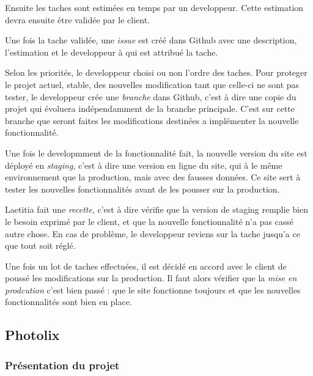 \bigskip

Ensuite les taches sont estimées en temps par un developpeur. Cette
estimation devra ensuite étre validée par le client.

\bigskip

Une fois la tache validée, une \emph{issue} est créé dans Github avec
une description, l'estimation et le developpeur à qui est attribué la
tache.

\bigskip

Selon les priorités, le developpeur choisi ou non l'ordre des taches.
Pour proteger le projet actuel, stable, des nouvelles modification tant
que celle-ci ne sont pas tester, le developpeur crée une \emph{branche}
dans Github, c'est à dire une copie du projet qui évoluera
indépendamment de la branche principale. C'est sur cette branche que
seront faites les modifications destinées a implémenter la nouvelle
fonctionnalité.

\bigskip

Une fois le developmment de la fonctionnalité fait, la nouvelle version
du site est déployé en \emph{staging}, c'est à dire une version en ligne
du site, qui à le même environnement que la production, mais avec des
fausses données. Ce site sert à tester les nouvelles fonctionnalités
avant de les pousser sur la production.

\bigskip

Laetitia fait une \emph{recette}, c'est à dire vérifie que la version de
staging remplie bien le besoin exprimé par le client, et que la nouvelle
fonctionnalité n'a pas cassé autre chose. En cas de problème, le
developpeur reviens sur la tache jusqu'a ce que tout soit réglé.

\bigskip

Une fois un lot de taches effectuées, il est décidé en accord avec le
client de poussé les modifications sur la production. Il faut alors
vérifier que la \emph{mise en prodcution} c'est bien passé : que le site
fonctionne toujours et que les nouvelles fonctionnalités sont bien en
place.

\bigskip

\subsection{Photolix}\label{photolix}

\subsubsection{Présentation du projet}\label{pruxe9sentation-du-projet}

